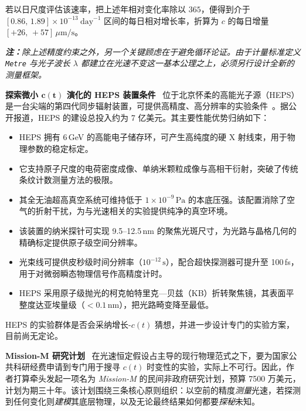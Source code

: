 \documentclass[12pt,leqno]{article}
\begin{document}
	\medskip
	若以日尺度评估该速率，把上述年相对变化率除以 $365$，便得到介于 $[0.86,\,1.89]\times 10^{-13}\ \mathrm{day}^{-1}$ 区间的每日相对增长率，折算为 $c$ 的每日增量 $[+26,\,+57]\, \mu\mathrm{m/s}$。
	
	\medskip
	\textit{\textbf{注：}除上述精度约束之外，另一个关键顾虑在于避免循环论证。由于计量标准定义 \texttt{Metre} 与光子波长 $\lambda$ 都建立在光速不变这一基本公理之上，必须另行设计全新的测量框架。}
	
	
	\medskip
	\bigskip
	\textbf{探索微小 $\boldsymbol{c(t)}$ 演化的 HEPS 装置条件}\,\,\,
	位于北京怀柔的高能光子源（HEPS）是一台尖端的第四代同步辐射装置，可提供高精度、高分辨率的实验条件~\cite{HEPS:2022}。据公开报道，HEPS 的建设总投入约为 7 亿美元。其主要性能优势归纳如下：
	
	\begin{itemize}
		\item HEPS 拥有 6\,GeV 的高能电子储存环，可产生高纯度的硬 X 射线束，用于物理参数的稳定标定。
		
		\item 它支持原子尺度的电荷密度成像、单纳米颗粒成像与高相干衍射，突破了传统条纹计数测量方法的极限。
		
		\item 其全无油超高真空系统可维持低于 $1\times10^{-9}\,\mathrm{Pa}$ 的本底压强。该配置消除了空气的折射干扰，为与光速相关的实验提供纯净的真空环境。
		
		\item 该装置的纳米探针可实现 9.5--12.5\,nm 的聚焦光斑尺寸，为光路与晶格几何的精确标定提供原子级空间分辨率。
		
		\item 光束线可提供皮秒级时间分辨率（$10^{-12}\,\mathrm{s}$），配合超快探测器可提升至 100\,fs，用于对微弱瞬态物理信号作高精度计时。
		
		\item HEPS 采用原子级抛光的柯克帕特里克—贝兹（KB）折转聚焦镜，其表面平整度达亚埃量级（$<0.1\,\mathrm{nm}$），把光路畸变降至最低。
	\end{itemize}
	
	\medskip
	HEPS 的实验群体是否会采纳增长-$c(t)$ 猜想，并进一步设计专门的实验方案，目前尚无定论。
	
	
	\medskip
	\bigskip
	\textbf{Mission-M 研究计划}\,\,\,
	在光速恒定假设占主导的现行物理范式之下，要为国家公共科研经费申请到专门用于搜寻 \(c(t)\) 时变性的实验，实际上不可行。因此，作者打算牵头发起一项名为 \textit{Mission-M} 的民间非政府研究计划，预算 7500 万美元，计划为期三十年。该计划围绕三条核心原则组织：以空前的精度\textit{测量}光速，若探测到任何变化则\textit{建模}其底层物理，以及无论最终结果如何都要\textit{探秘}未知。
	
\end{document}
